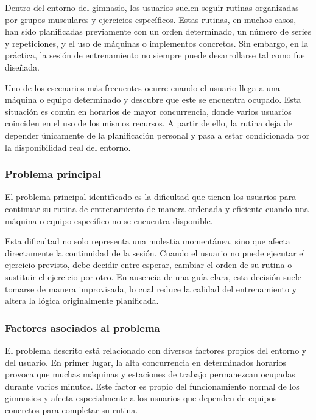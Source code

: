 Dentro del entorno del gimnasio, los usuarios suelen seguir rutinas organizadas por grupos musculares y ejercicios específicos. Estas rutinas, en muchos casos, han sido planificadas previamente con un orden determinado, un número de series y repeticiones, y el uso de máquinas o implementos concretos. Sin embargo, en la práctica, la sesión de entrenamiento no siempre puede desarrollarse tal como fue diseñada.

Uno de los escenarios más frecuentes ocurre cuando el usuario llega a una máquina o equipo determinado y descubre que este se encuentra ocupado. Esta situación es común en horarios de mayor concurrencia, donde varios usuarios coinciden en el uso de los mismos recursos. A partir de ello, la rutina deja de depender únicamente de la planificación personal y pasa a estar condicionada por la disponibilidad real del entorno.

\subsubsection{Problema principal}

El problema principal identificado es la dificultad que tienen los usuarios para continuar su rutina de entrenamiento de manera ordenada y eficiente cuando una máquina o equipo específico no se encuentra disponible.

Esta dificultad no solo representa una molestia momentánea, sino que afecta directamente la continuidad de la sesión. Cuando el usuario no puede ejecutar el ejercicio previsto, debe decidir entre esperar, cambiar el orden de su rutina o sustituir el ejercicio por otro. En ausencia de una guía clara, esta decisión suele tomarse de manera improvisada, lo cual reduce la calidad del entrenamiento y altera la lógica originalmente planificada.

\subsubsection{Factores asociados al problema}

El problema descrito está relacionado con diversos factores propios del entorno y del usuario. En primer lugar, la alta concurrencia en determinados horarios provoca que muchas máquinas y estaciones de trabajo permanezcan ocupadas durante varios minutos. Este factor es propio del funcionamiento normal de los gimnasios y afecta especialmente a los usuarios que dependen de equipos concretos para completar su rutina.

